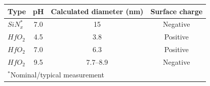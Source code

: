 \documentclass[border=2pt]{standalone}
\makeatletter
\renewenvironment{table}[1][]{%
    \begin{minipage}{\textwidth}\centering
    \def\@captype{table}%
}{%
    \end{minipage}%
}
\makeatother
\begin{document}
\begin{table}[ht]
\centering
\begin{tabular}{lccc}
\hline
\textbf{Type} & \textbf{pH} & \textbf{Calculated diameter (nm)} & \textbf{Surface charge} \\
\hline
$SiN_x^*$ & 7.0 & 15 & Negative \\
$HfO_2$ & 4.5 & 3.8 & Positive \\
$HfO_2$ & 7.0 & 6.3 & Positive \\
$HfO_2$ & 9.5 & 7.7--8.9 & Negative \\
\hline
\multicolumn{4}{l}{\footnotesize $^{*}$Nominal/typical measurement} \\
\end{tabular}
\end{table}
\end{document}
